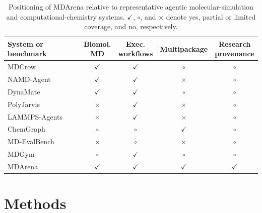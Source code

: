 \begin{table}[!htbp]
  \centering
  \caption[Positioning of MDArena relative to representative systems.]{Positioning of MDArena relative to representative agentic molecular-simulation and computational-chemistry systems. $\checkmark$, $\circ$, and $\times$ denote yes, partial or limited coverage, and no, respectively.}
  \label{tab:mdarena-positioning}
  \small
  \renewcommand{\arraystretch}{1.15}
  \begin{tabular*}{\textwidth}{@{\extracolsep{\fill}}lcccc@{}}
    \hline
    System or benchmark & \shortstack{Biomol.\\MD} & \shortstack{Exec.\\workflows} & Multipackage & \shortstack{Research\\provenance} \\
    \hline
    MDCrow~\cite{campbell2026mdcrow} & $\checkmark$ & $\checkmark$ & $\circ$ & $\circ$ \\
    NAMD-Agent~\cite{chandrasekhar2025namdagent} & $\checkmark$ & $\checkmark$ & $\times$ & $\circ$ \\
    DynaMate~\cite{guilbert2025dynamate} & $\checkmark$ & $\checkmark$ & $\circ$ & $\circ$ \\
    PolyJarvis~\cite{zhao2026polyjarvis} & $\times$ & $\checkmark$ & $\times$ & $\circ$ \\
    LAMMPS-Agents~\cite{vriza2026multiagentic} & $\times$ & $\checkmark$ & $\times$ & $\circ$ \\
    ChemGraph~\cite{pham2026chemgraph} & $\circ$ & $\circ$ & $\checkmark$ & $\circ$ \\
    MD-EvalBench~\cite{shi2026mdagent2} & $\times$ & $\circ$ & $\times$ & $\circ$ \\
    MDGym~\cite{kumar2026mdgym} & $\circ$ & $\checkmark$ & $\circ$ & $\circ$ \\
    MDArena & $\checkmark$ & $\checkmark$ & $\checkmark$ & $\checkmark$ \\
    \hline
  \end{tabular*}
\end{table}

\section{Methods}

